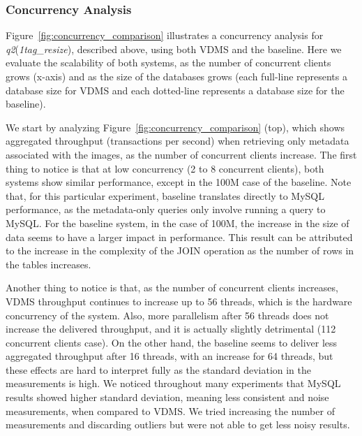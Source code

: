 
\subsubsection{Concurrency Analysis}

Figure~\ref{fig:concurrency_comparison} illustrates a concurrency analysis for
\textit{q2}(\textit{1tag\_resize}), described above,
using both VDMS and the baseline.
Here we evaluate the scalability of both systems, as the number of concurrent
clients grows (x-axis) and as the
size of the databases grows (each full-line represents a database size
for VDMS and each dotted-line represents a database size for the baseline).

We start by analyzing Figure~\ref{fig:concurrency_comparison} (top),
which shows aggregated throughput (transactions per second)
when retrieving only metadata associated with the images, as the number of
concurrent clients increase.
The first thing to notice is that at low concurrency (2 to 8 concurrent clients),
both systems show similar performance, except in the 100M case of the baseline.
Note that, for this particular experiment,
baseline translates directly to MySQL performance,
as the metadata-only queries only involve running a query to MySQL.
For the baseline system, in the case of 100M, the increase in the
size of data seems to have a larger impact in performance.
This result can be attributed to the increase in the complexity of the JOIN
operation as the number of rows in the tables increases.

Another thing to notice is that, as the number of concurrent clients increases,
VDMS throughput continues to increase up to 56 threads, which is
the hardware concurrency of the system.
Also, more parallelism after 56 threads does not increase the delivered throughput,
and it is actually slightly detrimental (112 concurrent clients case).
On the other hand, the baseline seems to deliver less aggregated
throughput after 16 threads, with an increase for 64 threads, but these effects
are hard to interpret fully as the standard deviation in the measurements is high.
We noticed throughout many experiments that MySQL results showed higher
standard deviation, meaning less consistent and noise measurements, when compared
to VDMS.
We tried increasing the number of measurements and discarding
outliers but were not able to get less noisy results.

